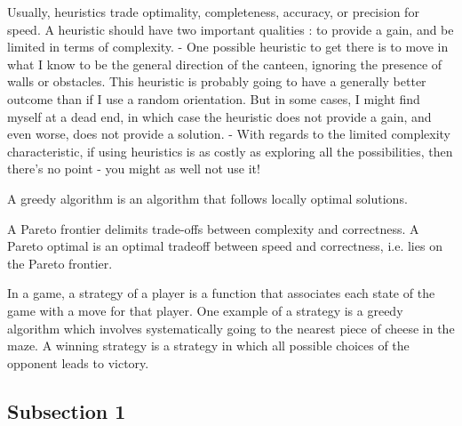 Usually, heuristics trade optimality, completeness, accuracy, or precision for speed.
A heuristic should have two important qualities : to provide a gain, and be limited in terms of complexity.
- One possible heuristic to get there is to move in what I know to be the general direction of the canteen, ignoring the presence of walls or obstacles. This heuristic is probably going to have a generally better outcome than if I use a random orientation. But in some cases, I might find myself at a dead end, in which case the heuristic does not provide a gain, and even worse, does not provide a solution.
- With regards to the limited complexity characteristic, if using heuristics is as costly as exploring all the possibilities, then there's no point - you might as well not use it! 

A greedy algorithm is an algorithm that follows locally optimal solutions.

A Pareto frontier delimits trade-offs between complexity and correctness. A Pareto optimal is an optimal tradeoff between speed and correctness, i.e. lies on the Pareto frontier.

In a game, a strategy of a player is a function that associates each state of the game with a move for that player.
One example of a strategy is a greedy algorithm which involves systematically going to the nearest piece of cheese in the maze.
A winning strategy is a strategy in which all possible choices of the opponent leads to victory.

\subsection{Subsection 1}

